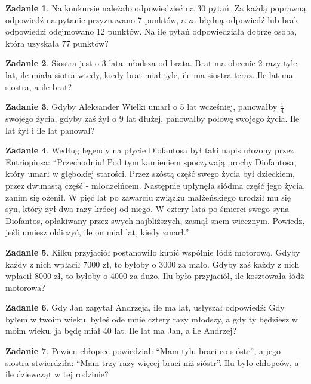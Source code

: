 \documentclass[11pt]{article}
\theoremstyle{definition}
\newtheorem{zad}{Zadanie}
\numberwithin{zad}{section}
\begin{document}
\begin{zad}
Na konkursie należało odpowiedzieć na 30 pytań. Za każdą poprawną odpowiedź na pytanie przyznawano 7 punktów, a za błędną odpowiedź lub brak odpowiedzi odejmowano 12 punktów. Na ile pytań odpowiedziała dobrze osoba, która uzyskała 77 punktów?
\end{zad}

\begin{zad}
Siostra jest o 3 lata młodsza od brata. Brat ma obecnie 2 razy tyle lat, ile miała siotra wtedy, kiedy brat miał tyle, ile ma siostra teraz. Ile lat ma siostra, a ile brat?
\end{zad}

\begin{zad}
Gdyby Aleksander Wielki umarł o 5 lat wcześniej, panowałby $\frac14$ swojego życia, gdyby zaś żył o 9 lat dłużej, panowałby połowę swojego życia. Ile lat żył i ile lat panował?
\end{zad}

\begin{zad}
Według legendy na płycie Diofantosa był taki napis ułozony przez Eutriopiusa: ``Przechodniu! Pod tym kamieniem spoczywają prochy Diofantosa, który umarł w głębokiej starości. Przez szóstą część swego życia był dzieckiem, przez dwunastą część - młodzeińcem. Następnie upłynęła siódma część jego życia, zanim się ożenił. W pięć lat po zawarciu związku małżeńskiego urodził mu się syn, który żył dwa razy krócej od niego. W cztery lata po śmierci swego syna Diofantos, opłakiwany przez swych najbliższych, zasnął snem wiecznym. Powiedz, jeśli umiesz obliczyć, ile on miał lat, kiedy zmarł.''
\end{zad}

\begin{zad}
Kilku przyjaciół postanowiło kupić wspólnie łódź motorową. Gdyby każdy z nich wpłacił 7000 zł, to byłoby o 3000 za mało. Gdyby zaś każdy z nich wpłacił 8000 zł, to byłoby o 4000 za dużo. Ilu było przyjaciół, ile kosztowała łódź motorowa?
\end{zad}

\begin{zad}
Gdy Jan zapytał Andrzeja, ile ma lat, usłyszał odpowiedź: Gdy byłem w twoim wieku, byłeś ode mnie cztery razy młodszy, a gdy ty będziesz w moim wieku, ja będę miał 40 lat. Ile lat ma Jan, a ile Andrzej?
\end{zad}

\begin{zad}
Pewien chłopiec powiedział: ``Mam tylu braci co sióstr'', a jego siostra stwierdziła: ``Mam trzy razy więcej braci niż sióstr''. Ilu było chłopców, a ile dziewcząt w tej rodzinie?
\end{zad}
\end{document}

